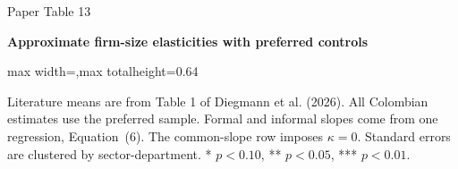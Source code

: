 \begin{frame}{Paper Table 13}
\begin{minipage}{\textwidth}\small\textbf{Approximate firm-size elasticities with preferred controls}\end{minipage}\par\vspace{0.15cm}
\centering\begingroup\fontsize{8.5}{10}\selectfont
\setlength{\tabcolsep}{4pt}\renewcommand{\arraystretch}{1.06}
\begin{adjustbox}{max width=\textwidth,max totalheight=0.64\textheight}

\end{adjustbox}\endgroup\par\vspace{0.10cm}
{\fontsize{6.5}{7.5}\selectfont\raggedright Literature means are from Table 1 of Diegmann et al. (2026). All Colombian estimates use the preferred sample. Formal and informal slopes come from one regression, Equation~(6). The common-slope row imposes $\kappa=0$. Standard errors are clustered by sector-department. * $p<0.10$, ** $p<0.05$, *** $p<0.01$.\par}
\end{frame}

